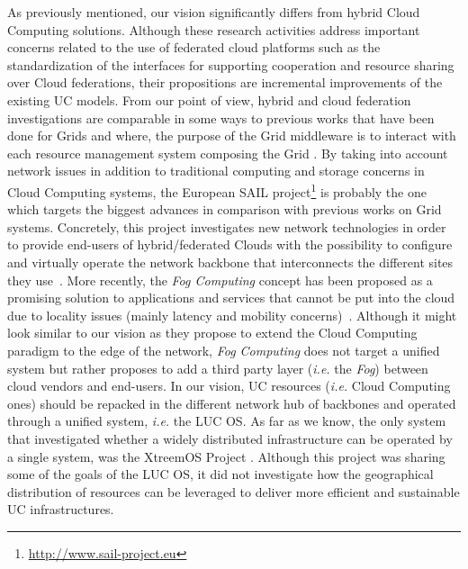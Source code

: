 \documentclass[11pt,a4paper,twoside]{article}
\begin{document}
As previously mentioned, our vision significantly differs from hybrid Cloud Computing
solutions.  Although these research activities address important concerns related to the
use of federated cloud platforms such as the standardization of the interfaces for
supporting cooperation and resource sharing over Cloud federations, their propositions are
incremental improvements of the existing UC models. From our point of view, hybrid and
cloud federation investigations are comparable in some ways to previous works that have
been done for Grids and where, the purpose of the Grid middleware is to interact with each
resource management system composing the Grid
\cite{buyya:2010,rochwerger:2009,zhao:2012}. By taking into account network issues in
addition to traditional computing and storage concerns in Cloud Computing systems, the
European SAIL
project\footnote{\href{http://www.sail-project.eu}{\url{http://www.sail-project.eu}}} is
probably the one which targets the biggest advances in comparison with previous works on
Grid systems. Concretely, this project investigates new network technologies in order to
provide end-users of hybrid/federated Clouds with the possibility to configure and
virtually operate the network backbone that interconnects the different sites they
use~\cite{sail:2012}.
%
More recently, the \emph{Fog Computing} concept has been proposed
as a promising solution to applications and services that
cannot be put into the cloud due to locality issues (mainly latency and
mobility concerns)~\cite{bonomi:2012}.  Although it might look similar to our vision as they
propose to extend the Cloud Computing paradigm to the edge of the network,
\emph{Fog Computing} does not target a unified system but rather proposes to
add a third party layer (\textit{i.e.} the \emph{Fog}) between cloud vendors and
end-users.
%
In our vision, UC resources (\textit{i.e.} Cloud Computing ones) should be repacked in
the different network hub of backbones and operated through a unified system, \textit{i.e.} the LUC OS.
%
As far as we know, the only system that investigated whether a
widely distributed infrastructure can be operated by a single system, was the
XtreemOS Project \cite{morin:2007}. Although this project was sharing some of
the goals of the LUC OS, it did not investigate how the geographical
distribution of resources can be leveraged to deliver more efficient and sustainable
UC infrastructures. 
%
\end{document}
